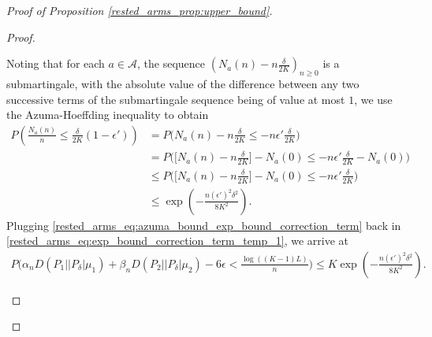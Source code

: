\begin{proof}[Proof of Proposition \ref{rested_arms_prop:upper_bound}]
\begin{proof}
\begin{enumerate}
Noting that for each $a\in\mathcal{A}$, the sequence $\left(N_a(n)-n\frac{\delta}{2K}\right)_{n\geq 0}$ is a submartingale, with the absolute value of the difference between any two successive terms of the submartingale sequence being of value at most $1$, we use the Azuma-Hoeffding inequality to obtain
\begingroup\allowdisplaybreaks\begin{align}
	P\left(\frac{N_a(n)}{n}\leq\frac{\delta}{2K}(1-\epsilon')\right)&=P\bigg(N_a(n)-n\frac{\delta}{2K}\leq -n\epsilon'\frac{\delta}{2K}\bigg)\nonumber\\
	&= P\bigg(\bigg[N_a(n)-n\frac{\delta}{2K}\bigg]-N_a(0)\leq -n\epsilon'\frac{\delta}{2K}-N_a(0)\bigg)\nonumber\\
	& \leq P\bigg(\bigg[N_a(n)-n\frac{\delta}{2K}\bigg]-N_a(0)\leq -n\epsilon'\frac{\delta}{2K}\bigg)\nonumber\\
	&\leq \exp\left(-\frac{n(\epsilon')^2\delta^2}{8K^2}\right).\label{rested_arms_eq:azuma_bound_exp_bound_correction_term}
\end{align}\endgroup
Plugging \eqref{rested_arms_eq:azuma_bound_exp_bound_correction_term} back in \eqref{rested_arms_eq:exp_bound_correction_term_temp_1}, we arrive at
\begingroup\allowdisplaybreaks\begin{align}
	P\bigg(\alpha_n D(P_1||P_\delta|\mu_1)+\beta_n D(P_2||P_\delta|\mu_2)-6\epsilon
	<\frac{\log((K-1)L)}{n}\bigg)
	\leq K\exp\left(-\frac{n(\epsilon')^2\delta^2}{8K^2}\right).
\end{align}\endgroup


\end{enumerate}
\end{proof}
\end{proof}
